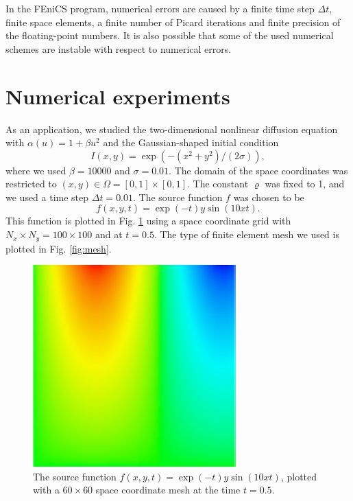 \documentclass[twoside]{article}
\begin{document}
In the FEniCS program, numerical errors are caused by a finite time step $\Delta t$, finite space elements, a finite number of Picard iterations and finite precision of the floating-point numbers. It is also possible that some of the used numerical schemes are instable with respect to numerical errors.


\section{Numerical experiments}


As an application, we studied the two-dimensional nonlinear diffusion equation with $\alpha(u) = 1 + \beta u^{2}$ and the Gaussian-shaped initial condition
\begin{equation}
  I(x, y) = \exp\left( -(x^{2} + y^{2})/(2\sigma )\right),
\end{equation} 
where we used $\beta = 10000$ and $\sigma = 0.01$. The domain of the space coordinates was restricted to $(x, y) \in \Omega = [0, 1]\times [0, 1]$. The constant $\varrho $ was fixed to 1, and we used a time step $\Delta t = 0.01$. The source function  $f$ was chosen to be
\begin{equation}
  f(x, y, t) = \exp(-t)y\sin(10xt). 
\end{equation}
This function is plotted in Fig. \ref{fig:f_t0.5} using a space coordinate grid with $N_{x} \times N_{y} = 100 \times 100$ and at $t = 0.5$. The type of finite element mesh we used is plotted in Fig. \ref{fig:mesh}.

\begin{figure} 
  \centering
  \includegraphics[scale=0.6]{figures/f_expxsinxt_60x60/f_expxsinxt_60x60_t0p5.pdf}
  \caption{The source function $f(x, y, t) = \exp(-t)y\sin(10xt)$, plotted with a $60 \times 60$ space coordinate mesh at the time $t = 0.5$.} \label{fig:f_t0.5}
\end{figure}
\end{document}
